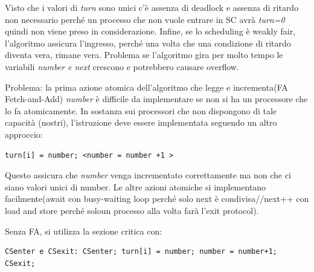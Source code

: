 \documentclass[10pt,a4paper]{book}
\begin{document}
Visto che i valori di \textit{turn} sono unici c'è assenza di deadlock e assenza di ritardo non necessario perché un processo che non vuole entrare in SC avrà \textit{turn=0} quindi non viene preso in considerazione.
Infine, se lo scheduling è weakly fair, l'algoritmo assicura l'ingresso, perché una volta che una condizione di ritardo diventa vera, rimane vera.
Problema se l'algoritmo gira per molto tempo le variabili \textit{number e next} crescono e potrebbero causare overflow.

Problema: la prima azione atomica dell'algoritmo che legge e incrementa(FA Fetch-and-Add) \textit{number} è difficile da implementare se non si ha un processore che lo fa atomicamente. In sostanza sui processori che non dispongono di tale capacità (nostri), l'istruzione deve essere implementata seguendo un altro approccio: \begin{verbatim}
turn[i] = number; <number = number +1 >
\end{verbatim} 
Questo assicura che \textit{number} venga incrementato correttamente ma non che ci siano valori unici di number.
Le altre azioni atomiche si implementano facilmente(await con busy-waiting loop perché solo next è condivisa//next++ con load and store perché soloun processo alla volta farà l'exit protocol).

Senza FA, si utilizza la sezione critica con: \begin{verbatim}CSenter e CSexit: CSenter; turn[i] = number; number = number+1; CSexit;\end{verbatim}
\end{document}
